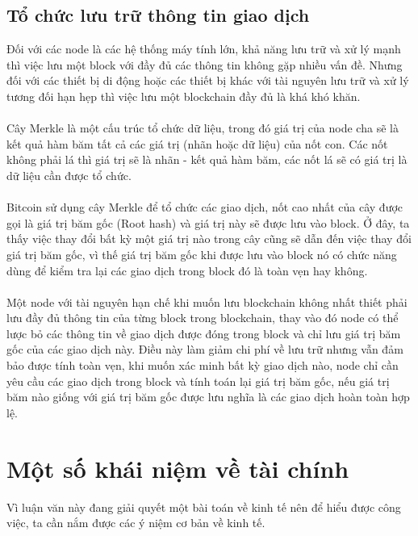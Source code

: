 \subsection{Tổ chức lưu trữ thông tin giao dịch}
Đối với các node là các hệ thống máy tính lớn, khả năng lưu trữ và xử lý mạnh thì 
việc lưu một block với đầy đủ các thông tin không gặp nhiều vấn đề. Nhưng đối 
với các thiết bị di động hoặc các thiết bị khác với tài nguyên lưu trữ và xử lý 
tương đối hạn hẹp thì việc lưu một blockchain đầy đủ là khá khó khăn.\\\\
Cây Merkle là một cấu trúc tổ chức dữ liệu, trong đó giá trị của node cha sẽ 
là kết quả hàm băm tất cả các giá trị (nhãn hoặc dữ liệu) của nốt con. Các nốt 
không phải lá thì giá trị sẽ là nhãn - kết quả hàm băm, các nốt lá sẽ có giá trị 
là dữ liệu cần được tổ chức.\\\\
Bitcoin sử dụng cây Merkle để tổ chức các giao dịch, nốt cao nhất của cây được 
gọi là giá trị băm gốc (Root hash) và giá trị này sẽ được lưu vào block. Ở đây,
ta thấy việc thay đổi bất kỳ một giá trị nào trong cây cũng sẽ dẫn đến việc thay 
đổi giá trị băm gốc, vì thế giá trị băm gốc khi được lưu vào block nó có chức 
năng dùng để kiểm tra lại các giao dịch trong block đó là toàn vẹn hay không.\\\\
Một node với tài nguyên hạn chế khi muốn lưu blockchain không nhất thiết phải 
lưu đầy đủ thông tin của từng block trong blockchain, thay vào đó node có thể 
lược bỏ các thông tin về giao dịch được đóng trong block và chỉ lưu giá trị băm 
gốc của các giao dịch này. Điều này làm giảm chi phí về lưu trữ nhưng vẫn đảm 
bảo được tính toàn vẹn, khi muốn xác minh bất kỳ giao dịch nào, node chỉ cần 
yêu cầu các giao dịch trong block và tính toán lại giá trị băm gốc, nếu giá trị 
băm nào giống với giá trị băm gốc được lưu nghĩa là các giao dịch hoàn toàn hợp 
lệ.
\section{Một số khái niệm về tài chính}
Vì luận văn này đang giải quyết một bài toán về kinh tế nên để hiểu được công 
việc, ta cần nắm được các ý niệm cơ bản về kinh tế.
